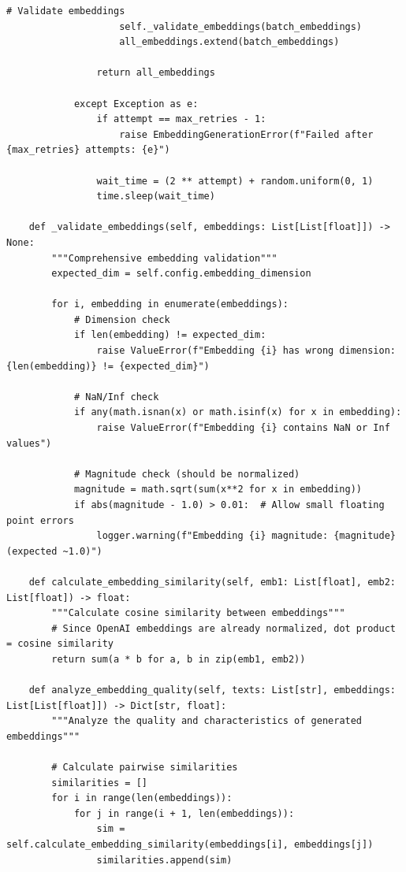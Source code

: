 \documentclass[12pt,a4paper]{article}
\begin{document}
\begin{lstlisting}[caption=Production-Ready Embedding System]
                    # Validate embeddings
                    self._validate_embeddings(batch_embeddings)
                    all_embeddings.extend(batch_embeddings)
                
                return all_embeddings
                
            except Exception as e:
                if attempt == max_retries - 1:
                    raise EmbeddingGenerationError(f"Failed after {max_retries} attempts: {e}")
                
                wait_time = (2 ** attempt) + random.uniform(0, 1)
                time.sleep(wait_time)
    
    def _validate_embeddings(self, embeddings: List[List[float]]) -> None:
        """Comprehensive embedding validation"""
        expected_dim = self.config.embedding_dimension
        
        for i, embedding in enumerate(embeddings):
            # Dimension check
            if len(embedding) != expected_dim:
                raise ValueError(f"Embedding {i} has wrong dimension: {len(embedding)} != {expected_dim}")
            
            # NaN/Inf check
            if any(math.isnan(x) or math.isinf(x) for x in embedding):
                raise ValueError(f"Embedding {i} contains NaN or Inf values")
            
            # Magnitude check (should be normalized)
            magnitude = math.sqrt(sum(x**2 for x in embedding))
            if abs(magnitude - 1.0) > 0.01:  # Allow small floating point errors
                logger.warning(f"Embedding {i} magnitude: {magnitude} (expected ~1.0)")
    
    def calculate_embedding_similarity(self, emb1: List[float], emb2: List[float]) -> float:
        """Calculate cosine similarity between embeddings"""
        # Since OpenAI embeddings are already normalized, dot product = cosine similarity
        return sum(a * b for a, b in zip(emb1, emb2))
    
    def analyze_embedding_quality(self, texts: List[str], embeddings: List[List[float]]) -> Dict[str, float]:
        """Analyze the quality and characteristics of generated embeddings"""
        
        # Calculate pairwise similarities
        similarities = []
        for i in range(len(embeddings)):
            for j in range(i + 1, len(embeddings)):
                sim = self.calculate_embedding_similarity(embeddings[i], embeddings[j])
                similarities.append(sim)
        

\end{lstlisting}
\end{document}
